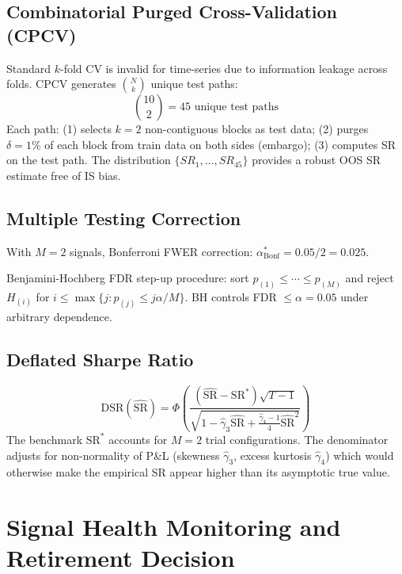 \documentclass[12pt,a4paper]{article}
\begin{document}
\subsection{Combinatorial Purged Cross-Validation (CPCV)}
\label{sec:cpcv}

Standard $k$-fold CV is invalid for time-series due to information leakage across folds. CPCV \citet{lopezdeprado2018} generates $\binom{N}{k}$ unique test paths:
\begin{equation}
  \binom{10}{2} = 45 \text{ unique test paths}
  \label{eq:cpcv_paths}
\end{equation}
Each path: (1) selects $k=2$ non-contiguous blocks as test data; (2) purges $\delta = 1\%$ of each block from train data on both sides (embargo); (3) computes SR on the test path. The distribution $\{SR_1, \ldots, SR_{45}\}$ provides a robust OOS SR estimate free of IS bias.

\subsection{Multiple Testing Correction}
\label{sec:mtc}

With $M=2$ signals, Bonferroni FWER correction: $\alpha^*_{\text{Bonf}} = 0.05/2 = 0.025$.

Benjamini-Hochberg FDR step-up procedure: sort $p_{(1)} \leq \cdots \leq p_{(M)}$ and reject $H_{(i)}$ for $i \leq \max\{j: p_{(j)} \leq j\alpha/M\}$. BH controls FDR $\leq \alpha = 0.05$ under arbitrary dependence.

\subsection{Deflated Sharpe Ratio}
\label{sec:dsr}

\begin{equation}
  \text{DSR}(\hat{\text{SR}}) = \Phi\!\left(\frac{(\hat{\text{SR}} - \text{SR}^*)\sqrt{T-1}}
    {\sqrt{1 - \hat{\gamma}_3 \hat{\text{SR}} + \tfrac{\hat{\gamma}_4-1}{4}\hat{\text{SR}}^2}}\right)
  \label{eq:dsr}
\end{equation}
The benchmark $\text{SR}^*$ accounts for $M=2$ trial configurations. The denominator adjusts for non-normality of P\&L (skewness $\hat{\gamma}_3$, excess kurtosis $\hat{\gamma}_4$) which would otherwise make the empirical SR appear higher than its asymptotic true value.

\section{Signal Health Monitoring and Retirement Decision}
\label{sec:monitoring}
\end{document}
